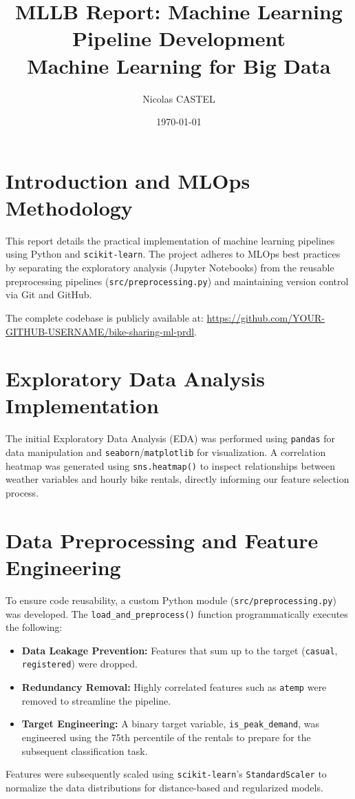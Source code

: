 \documentclass[12pt,a4paper]{article}
\title{\textbf{MLLB Report: Machine Learning Pipeline Development}\\ \large Machine Learning for Big Data}
\author{Nicolas CASTEL}
\date{\today}
\begin{document}
\maketitle

\section{Introduction and MLOps Methodology}
This report details the practical implementation of machine learning pipelines using Python and \texttt{scikit-learn}. The project adheres to MLOps best practices by separating the exploratory analysis (Jupyter Notebooks) from the reusable preprocessing pipelines (\texttt{src/preprocessing.py}) and maintaining version control via Git and GitHub.

The complete codebase is publicly available at: \url{https://github.com/YOUR-GITHUB-USERNAME/bike-sharing-ml-prdl}.

\section{Exploratory Data Analysis Implementation}
The initial Exploratory Data Analysis (EDA) was performed using \texttt{pandas} for data manipulation and \texttt{seaborn}/\texttt{matplotlib} for visualization. A correlation heatmap was generated using \texttt{sns.heatmap()} to inspect relationships between weather variables and hourly bike rentals, directly informing our feature selection process.

\section{Data Preprocessing and Feature Engineering}
To ensure code reusability, a custom Python module (\texttt{src/preprocessing.py}) was developed. The \texttt{load\_and\_preprocess()} function programmatically executes the following:
\begin{itemize}
    \item \textbf{Data Leakage Prevention:} Features that sum up to the target (\texttt{casual}, \texttt{registered}) were dropped.
    \item \textbf{Redundancy Removal:} Highly correlated features such as \texttt{atemp} were removed to streamline the pipeline.
    \item \textbf{Target Engineering:} A binary target variable, \texttt{is\_peak\_demand}, was engineered using the 75th percentile of the rentals to prepare for the subsequent classification task.
\end{itemize}
Features were subsequently scaled using \texttt{scikit-learn}'s \texttt{StandardScaler} to normalize the data distributions for distance-based and regularized models.
\end{document}

